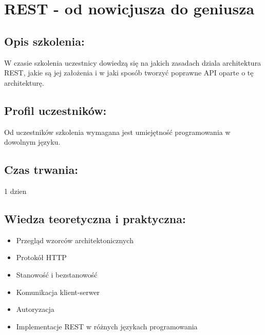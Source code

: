 \documentclass{article}[10pt]
\begin{document}
\newpage


    
	\section{REST - od nowicjusza do geniusza}

	\subsection*{Opis szkolenia:}
	\begin{adjustwidth}{2cm}{}
\justifying
		W czasie szkolenia uczestnicy dowiedzą się na jakich zasadach dziala architektura REST, jakie są jej założenia i w jaki sposób tworzyć poprawne API oparte o tę architekturę.
	\end{adjustwidth}
	\subsection*{Profil uczestników:}
\begin{adjustwidth}{2cm}{}
\justifying
	
Od uczestników szkolenia wymagana jest umiejętność programowania w dowolnym języku.

\end{adjustwidth}
	\subsection*{Czas trwania:}
\begin{adjustwidth}{2cm}{}
	1 dzien
\end{adjustwidth}

	\subsection*{Wiedza teoretyczna i praktyczna:}
\begin{adjustwidth}{1.5cm}{}
	\begin{itemize}
		\item Przegląd wzorców architektonicznych
		\item Protokół HTTP
		\item Stanowość i bezstanowość
		\item Komunikacja klient-serwer
		\item Autoryzacja
		\item Implementacje REST w różnych językach programowania
	\end{itemize}
\end{adjustwidth}
\end{document}
